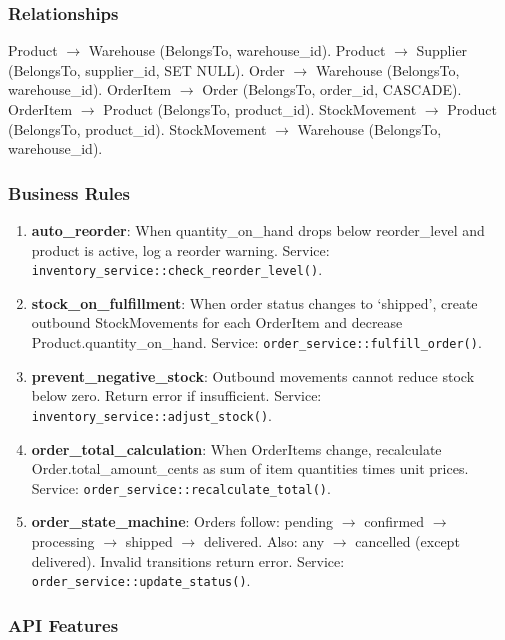 \documentclass[11pt,a4paper]{article}
\begin{document}
\subsubsection{Relationships}

Product $\to$ Warehouse (BelongsTo, warehouse\_id).
Product $\to$ Supplier (BelongsTo, supplier\_id, SET NULL).
Order $\to$ Warehouse (BelongsTo, warehouse\_id).
OrderItem $\to$ Order (BelongsTo, order\_id, CASCADE).
OrderItem $\to$ Product (BelongsTo, product\_id).
StockMovement $\to$ Product (BelongsTo, product\_id).
StockMovement $\to$ Warehouse (BelongsTo, warehouse\_id).

\subsubsection{Business Rules}

\begin{enumerate}
\item \textbf{auto\_reorder}: When quantity\_on\_hand drops below
  reorder\_level and product is active, log a reorder warning.
  Service: \texttt{inventory\_service::check\_reorder\_level()}.

\item \textbf{stock\_on\_fulfillment}: When order status changes to
  `shipped', create outbound StockMovements for each OrderItem and
  decrease Product.quantity\_on\_hand. Service:
  \texttt{order\_service::fulfill\_order()}.

\item \textbf{prevent\_negative\_stock}: Outbound movements cannot
  reduce stock below zero. Return error if insufficient.
  Service: \texttt{inventory\_service::adjust\_stock()}.

\item \textbf{order\_total\_calculation}: When OrderItems change,
  recalculate Order.total\_amount\_cents as sum of item quantities
  times unit prices. Service: \texttt{order\_service::recalculate\_total()}.

\item \textbf{order\_state\_machine}: Orders follow:
  pending $\to$ confirmed $\to$ processing $\to$ shipped $\to$ delivered.
  Also: any $\to$ cancelled (except delivered). Invalid transitions
  return error. Service: \texttt{order\_service::update\_status()}.
\end{enumerate}

\subsubsection{API Features}
\end{document}
